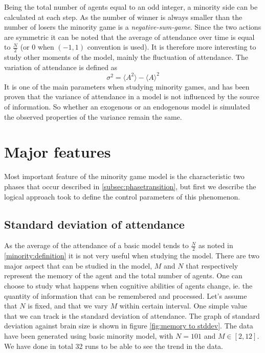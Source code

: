 Being the total number of agents equal to an odd integer, a minority side can be calculated at each step.
As the number of winner is always smaller than the number of losers the minority game is a \textit{negative-sum-game}.
Since the two actions are symmetric it can be noted that the average of attendance over time is equal to $\frac{N}{2}$ (or $0$ when $(-1,1)$ convention is used).
It is therefore more interesting to study other moments of the model, mainly the fluctuation of attendance.
The variation of attendance is defined as
\begin{displaymath}
\sigma^2 = \langle A^2 \rangle - \langle A \rangle^2
\end{displaymath}
It is one of the main parameters when studying minority games, and has been proven that the variance of attendance in a model is not influenced by the source of information.
So whether an exogenous or an endogenous model is simulated the observed properties of the variance remain the same.

\section{Major features}
\label{miinority:majorfeatures}
Most important feature of the minority game model  is the characteristic two phases that occur described in \ref{subsec:phasetransition}, but first we describe the logical approach took to define the control parameters of this phenomenon.

\subsection{Standard deviation of attendance}
\label{subsec:stddev}

As the average of the attendance of a basic model tends to $\frac{N}{2}$ as noted in \ref{minority:definition} it is not very useful when studying the model.
There are two major aspect that can be studied in the model, $M$ and $N$ that respectively represent the memory of the agent and the total number of agents.
One can choose to study what happens when cognitive abilities of agents change, ie. the quantity of information that can be remembered and processed.
Let's assume that $N$ is fixed, and that we vary $M$ within certain interval.
One simple value that we can track is the standard deviation of attendance.
The graph of standard deviation against brain size is shown in figure \ref{fig:memory to stddev}.
The data have been generated using basic minority model, with $N=101$ and $M\in[2,12]$.
We have done in total 32 runs to be able to see the trend in the data.

